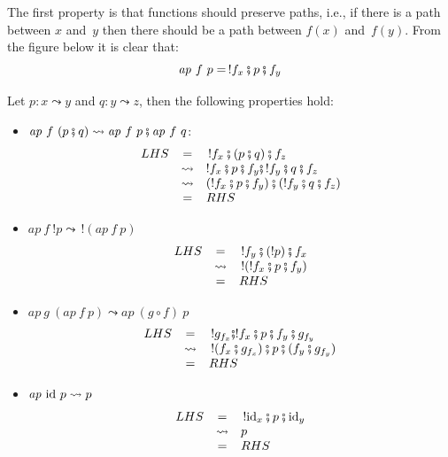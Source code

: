 \documentclass[11pt]{article}
\newcommand{\cp}{\circ}                 %
\newcommand{\pc}{\fatsemi}                 %
\newcommand{\id}{\textrm{\rm id}}       %
\renewcommand{\path}{\leadsto}
\newcommand{\ap}[2]{\mathit{ap}~#1~#2}
\begin{document}
The first property is that functions should preserve paths, i.e., if there is
a path between $x$ and~$y$ then there should be a path between $f(x)$
and~$f(y)$. From the figure below it is clear that:
\[ 
\ap{f}{p} = \, !f_x \pc p \pc f_y
\]

\begin{center}
\end{center}

Let $p : x \path y$ and $q : y \path z$, then the following properties 
hold:
\begin{itemize}
\item $\ap{f}{(p \pc q)} \path \ap{f}{p} \pc \ap{f}{q}$:
\[\begin{array}{rcl}
LHS &=& \, !f_x \pc (p \pc q) \pc f_z \\
    &\path& ! f_x \pc p \pc f_y \pc \, ! f_y \pc q \pc f_z \\
    &\path& (! f_x \pc p \pc f_y) \pc (! f_y \pc q \pc f_z) \\
    &=& RHS
\end{array}\]
\item $\ap{f}{!p} \path \, !(\ap{f}{p})$
\[\begin{array}{rcl}
LHS &=& \, !f_y \pc (!p) \pc f_x \\
    &\path& \, !(!f_x \pc p \pc f_y) \\
    &=& RHS
\end{array}\]
\item $\ap{g}{(\ap{f}{p})} \path \ap{(g \cp f)}{p}$
\[\begin{array}{rcl}
LHS &=& \, !g_{f_x} \pc !f_x \pc p \pc f_y \pc g_{f_y} \\
    &\path& \, ! (f_x \pc g_{f_x}) \pc p \pc (f_y \pc g_{f_y}) \\
    &=& RHS
\end{array}\]
\item $\ap{\id}{p} \path p$
\[\begin{array}{rcl}
LHS &=& \, !\id_x \pc p \pc \id_y \\
    &\path& p \\
    &=& RHS
\end{array}\]
\end{itemize}
\end{document}
